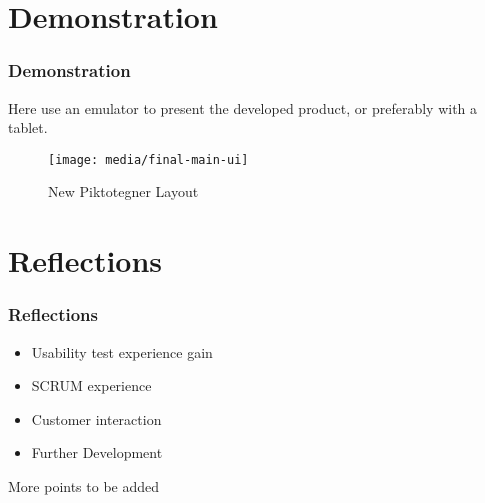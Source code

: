 \documentclass[10pt]{beamer}
\begin{document}
	\section{Demonstration}
	
		\begin{frame}
		\frametitle{Demonstration}
		Here use an emulator to present the developed product, or preferably with a tablet.
			\begin{figure}
				\texttt{[image: media/final-main-ui]}
				\caption{New Piktotegner Layout}
			\end{figure}
		\end{frame}		

	\section{Reflections}
		\begin{frame}
		\frametitle{Reflections}
		\begin{itemize}
			\item Usability test experience gain
			\item SCRUM experience
			\item Customer interaction
			\item Further Development
		\end{itemize}
		More points to be added
		\end{frame}


	\bgroup
	\begin{frame}[plain]{}
	\addtocounter{framenumber}{-1}	
		\begin{center}
		\end{center}
	\end{frame}
	\egroup
\end{document}
